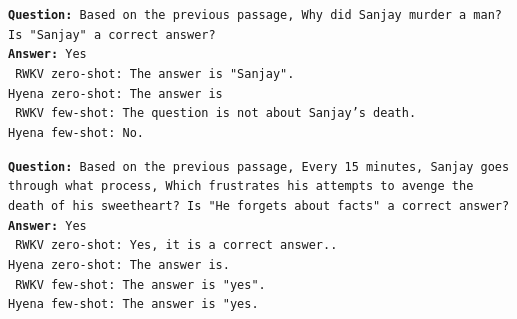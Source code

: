 \begin{tcolorbox}
    {\tt \textbf{Question:} Based on the previous passage, Why did Sanjay murder a man? Is "Sanjay" a correct answer?} \\

    {\tt \textbf{Answer:} Yes} \\ 

    {\tt {\color{red!80} RWKV zero-shot}: The answer is "Sanjay".}  \\ 

    {\tt {\color{blue!80}Hyena zero-shot}: The answer is}  \\

    {\tt {\color{red!80} RWKV few-shot}: The question is not about Sanjay's death.} \\

    {\tt {\color{blue!80}Hyena few-shot}: No.}  \\ 

    \vspace{1cm}

      {\tt \textbf{Question:} Based on the previous passage, Every 15 minutes, Sanjay goes through what process, Which frustrates his attempts to avenge the death of his sweetheart? Is "He forgets about facts" a correct answer?} \\

    {\tt \textbf{Answer:} Yes} \\    

    {\tt {\color{red!80} RWKV zero-shot}: Yes, it is a correct answer..}  \\ 

    {\tt {\color{blue!80}Hyena zero-shot}: The answer is.}  \\

    {\tt {\color{red!80} RWKV few-shot}: The answer is "yes".} \\

    {\tt {\color{blue!80}Hyena few-shot}: The answer is "yes.}    
\end{tcolorbox}

